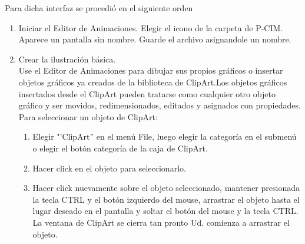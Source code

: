 Para dicha interfaz se procedió en el siguiente orden
\begin{enumerate}
 \item Iniciar el Editor de Animaciones. Elegir el icono de la carpeta de P-CIM. Aparece un pantalla 
 sin nombre. Guarde el archivo asignandole un nombre.
 \item Crear la ilustración básica.\\
    Use el Editor de Animaciones para  dibujar sus propios gráficos 
    o insertar objetos gráficos ya creados de la biblioteca de ClipArt.Los objetos gráficos insertados 
    desde el ClipArt pueden tratarse como cualquier otro objeto gráfico y ser movidos, redimensionados, 
    editados y asignados con propiedades.
    Para seleccionar un objeto de ClipArt:
    \begin{enumerate}
      \item Elegir "’ClipArt” en el menú File, luego elegir la categoría en el submenú o elegir el botón 
      categoría de la caja de ClipArt.
      \item Hacer click en el objeto para seleccionarlo.
      \item Hacer click nuevamente sobre el objeto seleccionado, mantener presionada la tecla CTRL y 
      el botón izquierdo del mouse, arrastrar el objeto hasta el lugar deseado en el pantalla y soltar 
      el botón del mouse y la tecla CTRL. La ventana de ClipArt se cierra tan pronto Ud. comienza a 
      arrastrar el objeto.
    \end{enumerate}


\end{enumerate}

